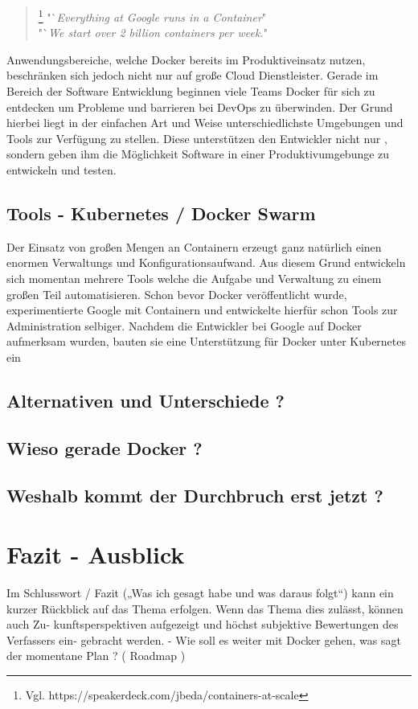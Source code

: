 \documentclass[12pt,toc=bib,toc=listof]{scrreprt}
\begin{document}
\begin{quote}
	\footnote[1]{Vgl. https://speakerdeck.com/jbeda/containers-at-scale}
	"`\textit{Everything at Google runs in a Container}"\\
	"`\textit{We start over 2 billion containers per week.}"
\end{quote}

Anwendungsbereiche, welche Docker bereits im Produktiveinsatz nutzen, beschränken sich jedoch nicht nur auf große Cloud Dienstleister.
Gerade im Bereich der Software Entwicklung beginnen viele Teams Docker für sich zu entdecken um Probleme und barrieren bei DevOps zu überwinden.
Der Grund hierbei liegt in der einfachen Art und Weise unterschiedlichste Umgebungen und Tools zur Verfügung zu stellen.
Diese unterstützen den Entwickler nicht nur , sondern geben ihm die Möglichkeit Software in einer Produktivumgebunge zu entwickeln und testen.

\section{Tools - Kubernetes / Docker Swarm}
Der Einsatz von großen Mengen an Containern erzeugt ganz natürlich einen enormen Verwaltungs und Konfigurationsaufwand.
Aus diesem Grund entwickeln sich momentan mehrere Tools welche die Aufgabe und Verwaltung zu einem großen Teil automatisieren.
Schon bevor Docker veröffentlicht wurde, experimentierte Google mit Containern und entwickelte hierfür schon Tools zur Administration selbiger.
Nachdem die Entwickler bei Google auf Docker aufmerksam wurden, bauten sie eine Unterstützung für Docker unter Kubernetes ein


\section{Alternativen und Unterschiede ?}

\section{Wieso gerade Docker ?}

\section{Weshalb kommt der Durchbruch erst jetzt ?}

\chapter{Fazit - Ausblick} %
\label{sec:fazit}
Im Schlusswort / Fazit („Was ich gesagt habe und was daraus folgt“) kann ein kurzer
Rückblick auf das Thema erfolgen. Wenn das Thema dies zulässt, können auch Zu-
kunftsperspektiven aufgezeigt und höchst subjektive Bewertungen des Verfassers ein-
gebracht werden.
- Wie soll es weiter mit Docker gehen, was sagt der momentane Plan ? ( Roadmap )
\end{document}
